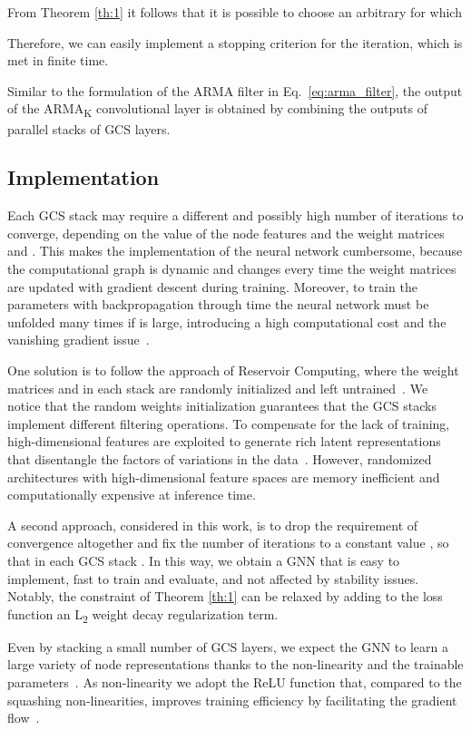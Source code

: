 \documentclass{article}
\begin{document}
From Theorem \ref{th:1} it follows that it is possible to choose an arbitrary  for which

Therefore, we can easily implement a stopping criterion for the iteration, which is met in finite time.

Similar to the formulation of the ARMA filter in Eq.~\eqref{eq:arma_filter}, the output of the ARMA\textsubscript{K} convolutional layer is obtained by combining the outputs of  parallel stacks of GCS layers.

\subsection{Implementation}
Each GCS stack  may require a different and possibly high number of iterations  to converge, depending on the value of the node features  and the weight matrices  and .
This makes the implementation of the neural network cumbersome, because the computational graph is dynamic and changes every time the weight matrices are updated with gradient descent during training.
Moreover, to train the parameters with backpropagation through time the neural network must be unfolded many times if  is large, introducing a high computational cost and the vanishing gradient issue~\cite{bianchi2017recurrent}.

One solution is to follow the approach of Reservoir Computing, where the weight matrices  and  in each stack are randomly initialized and left untrained~\cite{lukovsevivcius2009reservoir, gallicchio2020fast}.
We notice that the random weights initialization guarantees that the  GCS stacks implement different filtering operations. 
To compensate for the lack of training, high-dimensional features are exploited to generate rich latent representations that disentangle the factors of variations in the data~\cite{tino2020dynamical}.
However, randomized architectures with high-dimensional feature spaces are memory inefficient and computationally expensive at inference time.

A second approach, considered in this work, is to drop the requirement of convergence altogether and fix the number of iterations to a constant value , so that  in each GCS stack .
In this way, we obtain a GNN that is easy to implement, fast to train and evaluate, and not affected by stability issues.
Notably, the constraint  of Theorem \ref{th:1} can be relaxed by adding to the loss function an L\textsubscript{2} weight decay regularization term.

Even by stacking a small number  of GCS layers, we expect the GNN to learn a large variety of node representations thanks to the non-linearity and the trainable parameters~\cite{raghu2017expressive}.
As non-linearity we adopt the ReLU function that, compared to the squashing non-linearities, improves training efficiency by facilitating the gradient flow~\cite{goodfellow2016deep}.
\end{document}
